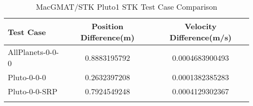 \begin{table}[htbp!]
\centering
\caption{ MacGMAT/STK Pluto1 STK Test Case Comparison}
      \begin{tabular}{lcc}
      \hline\hline
          Test Case & Position Difference(m) & Velocity Difference(m/s) \\
         \hline
         AllPlanets-0-0-0 & 0.8883195792 & 0.0004683900493 \\
         Pluto-0-0-0 & 0.2632397208 & 0.0001382385283 \\
         Pluto-0-0-SRP & 0.7924549248 & 0.0004129302367 \\
      \hline\hline
      \label{Table: Pluto1 STK Table} 
\end{tabular}
\end{table}
